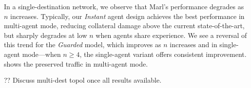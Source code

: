 \documentclass[10pt, times, comsoc]{IEEEtran}
\begin{document}
%	
%
%	
%
%	

In a single-destination network, we observe that Marl's performance degrades as $n$ increases.
Typically, our \emph{Instant} agent design achieves the best performance in multi-agent mode, reducing collateral damage above the current state-of-the-art, but sharply degrades at low $n$ when agents share experience.
We see a reversal of this trend for the \emph{Guarded} model, which improves as $n$ increases and in single-agent mode---when $n\ge4$, the single-agent variant offers consistent improvement.
 shows the preserved traffic in multi-agent mode.

?? Discuss multi-dest topol once all results available.
\end{document}

